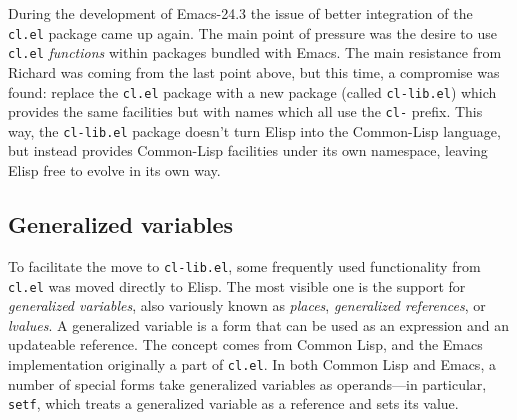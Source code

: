 \documentclass[format=acmsmall, review=false, screen=true]{acmart}
\newcommand \Elisp {Elisp}
\begin{document}

During the development of Emacs-24.3 the issue of better integration of the
\texttt{cl.el} package came up again.  The main point of pressure was the
desire to use \texttt{cl.el} \emph{functions} within packages bundled with
Emacs.  The main resistance from Richard was coming from the last point
above, but this time, a compromise was found: replace
the \texttt{cl.el} package with a new package (called \texttt{cl-lib.el})
which provides the same facilities but with names which all use the
\texttt{cl-} prefix.  This way, the \texttt{cl-lib.el} package doesn't turn
\Elisp{} into the Common-Lisp language, but instead provides Common-Lisp
facilities under its own namespace, leaving \Elisp{} free to evolve in its
own way.


\subsection{Generalized variables} %

To facilitate the move to \texttt{cl-lib.el}, some frequently used
functionality from \texttt{cl.el} was moved directly to \Elisp{}.  The
most visible one is the support for \emph{generalized variables}, also
variously known as \emph{places}, \emph{generalized references}, or
\emph{lvalues}.  A generalized variable is a form that can be used as
an expression and an updateable reference.  The concept comes from
Common Lisp, and the Emacs implementation originally a part of
\texttt{cl.el}.  In both Common Lisp and Emacs, a number of special
forms take generalized variables as operands---in particular,
\texttt{setf}, which treats a generalized variable as a reference and
sets its value.
\end{document}
